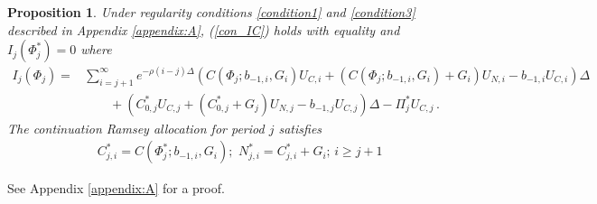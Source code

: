\documentclass[12pt]{article}
\newtheorem{proposition}{Proposition}
\begin{document}
\begin{proposition} \label{proplag2} 
Under  regularity conditions \ref{condition1} and \ref{condition3} described in Appendix \ref{appendix:A}, %
(\ref{con_IC}) holds with equality and   $I_j(\Phi_j^*)=0$ 
where
\begin{align}
I_j(\Phi_j) 
=&   \sum_{i=j+1}^{\infty} e^{-\rho(i-j) \Delta} \left(  C(\Phi_j; b_{-1, i}, G_{i})U_{C, i} + (C(\Phi_j; b_{-1, i}, G_{i})+G_{i})U_{N, i} -b_{-1, i} U_{C, i} \right) \Delta \nonumber \\
& \quad\quad + \left (C_{0, j}^*U_{C, j} + (C_{0, j}^*+G_{j})U_{N, j} - b_{-1,j} U_{C, j} \right)\Delta -\Pi_{{j}}^*U_{C, j} \,.\label{con_IC2}
\end{align}
The continuation Ramsey allocation for period $j$ satisfies 
\begin{eqnarray} \label{ContinueC}
&	 {C}^\ast_{j, i} =     C(\Phi_j^{*}; b_{-1, i}, G_{i}); \, \, 
{N}^*_{j, i}  =    {C}_{j, i}^\ast +G_{i} ; \, i\geq j+1 
\end{eqnarray}

\end{proposition}
See Appendix \ref{appendix:A} for a proof.
\end{document}
